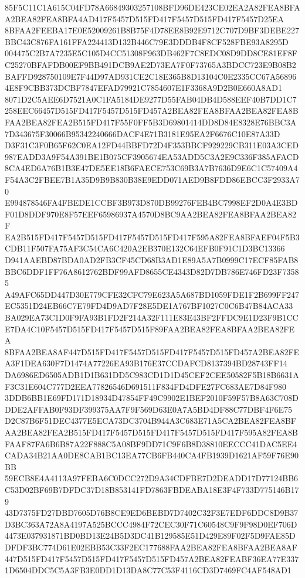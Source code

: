 \documentclass[UTF8,fontset=fandol,zihao=-4,a4paper]{ctexart}
\begin{document}
{{85F5C11C1A615C04FD78A66849303257108BFD96DE423CE02EA2A82FEA8BFAA2BEA82FEA8BFA4AD417F5457D515FD417F5457D515FD417F5457D25EA
8BFAA2FEEBA17E0E52009261B8B75F4D78EE8B92E9712C707D9BF3DEBE227BBC43C876FA161FFA224413D132B446C79E3DDDB4F8CF528FBE93A8295D
004475C2B7A7235E5C105D4CC51308F963DB462F7C8EDC08D9DD8CE81EF8FC25270BFAFDB00EF9BB491DCB9AE2D73EA7F0F73765A3BDCC723E9B08B2
BAFFD928750109E7F44D97AD931CE2C18E365B8D13104C0E2335CC67A568964E8F9CBB373DCBF7847EFAD79921C7854607E1F3368A9D2B0E660A8AD1
8071D2C5AEE6D7521A0C1FA5184DE9277D55FAB04DB4D588EEF40B7DD1C7258EEC66457D515FD417F5457D515FD457A2BEA82FEA8BFAA2BEA82FEA8B
FAA2BEA82FEA2B515FD417F55F0FF5B3D69801414DD8D84E8328E76BBC3A7D343675F30066B95342240666DACF4E71B3181E95EA2F6676C10E87A33D
D3F31C3F0B65F62C0EA12FD44BBFD72D4F353BBCF929229CB311E03A3CED987EADD3A9F54A391BE1B075CF3905674EA53ADD5C3A2E9C336F385AFACD
8CA4ED6A76B1B3E47DE5EE18B6FAECE753C69B3A7B7636D9E6C1C57409A4F54A3C2FBEE7B1A35D9B9B830B38E9EDD071AED9B8FDD86EBCC3F2933A70
E994878546FA4FBEDE1CCBF3B973D870DB99276FEB4BC7998EF2D0A4E3BDF01D8DDF970E8F57EEF65986937A4570D8BC9AA2BEA82FEA8BFAA2BEA82F
EA2B515FD417F5457D515FD417F5457D515FD417F595A82FEA8BFAEF04F5B3CDB11F507FA75AF3C54CA6C420A2EB370E132C64EFB0F91C1D3BC13366
D941AAEBD87BDA0AD2FB3CF45CD68B3AD1E89A5A7B0999C17ECF85FAB8BBC6DDF1FF76A8612762BDF99AFD8655CE4343D82D7DB786E746FD23F73585
A49AFC65DD447D30E779CFE32CFC79E623A5A687BD1059FDE1F2B699FF247EC5351D24EB66C7E79FD4D9AD7F28E5DE1A767BF1027C0C6B47B84ACA33
BA029EA73C1D0F9FA93B1FD2F214A32F111E83E43BF2FFDC9E1D23F9B1CCE7DA4C10F5457D515FD417F5457D515F89FAA2BEA82FEA8BFAA2BEA82FEA
8BFAA2BEA8AF447D515FD417F5457D515FD417F5457D515FD457A2BEA82FEA3F1DEA630F7D1474A77226EA93B176E37CCDAFCD8137394BD28743FF14
DA6986ED6505ADB1D1B631DD5C983CD1D1D45CEF2CEE50582F5B18B6631AF3C31E604C777D2EEA77826546D691511F834FD4DFE27FC683AE7D84F980
3DDB6BB1E69FD171D18934D47854FF49C9902E1BEF2010F59F57B8A63C708DDDE2AFFAB0F93DF399375AA7F9F569D63E0A7A5BD4DF88C77DBF4F6E75
D2C87B6F51DEC4377E5ECA73DC3704B944A3C683E71A5CA2BEA82FEA8BFAA2BEA82FEA2B515FD417F5457D515FD417F5457D515FD417F595A82FEA8B
FAAF87FA6B6B87A22F888C5A08BF9DD71C9F6B8D38810EECCC41DAC5EE4CADA34B21AA0DE8CAB1BC13EA77CB6FB440CA4FB1939D1621AF59F76E90BB
59ECB8E4A4113A97FEBA6C0DCC272D9A34CDFBE7D2DEADD17D77124BB6C53D02BF69B7DFDC37D18B853141FD7863FBDEABA18E3F4F733D775146B179
43D7375FD27DBD7605D76B8CE9ED6BEBD7D7402C32F3E7EDF6DDC8D9B37D3BC363A72A8A4197A525BCCC4984F72CEC30F71C60548C9F9F98D0EF706D
4473E037931871BD0BD13E24B5D3DC41B129585E51D429E89F02F5D9FAE85DDFDF3BC774D61E02EBB53C33F2EC177688FAA2BEA82FEA8BFAA2BEA8AF
447D515FD417F5457D515FD417F5457D515FD457A2BEA82FEABF36EA77E3371D6504DDC5C5A3FB3E0DD1D13DA8C77C53F4116CD3D7469FC4AF548AD1
}}
\end{document}
